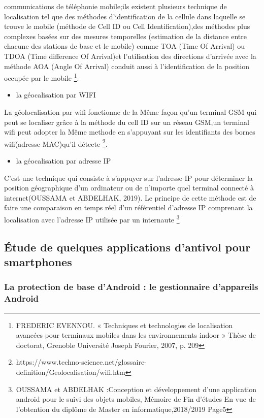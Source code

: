 \documentclass[a4paper, 12pt]{article}
\begin{document}
communications de téléphonie mobile;ils existent plusieurs technique de localisation tel que des méthodes d’identification de la cellule dans laquelle se trouve le mobile (méthode de Cell ID ou Cell Identification),des méthodes plus complexes basées sur des mesures temporelles (estimation de la distance entre chacune des stations de base et le mobile) comme TOA (Time Of Arrival) ou TDOA (Time difference Of Arrival)et l’utilisation des directions d’arrivée avec la méthode AOA (Angle Of Arrival) conduit aussi à l’identification de la position occupée par le mobile \footnote{FREDERIC EVENNOU. « Techniques et technologies de localisation avancées pour terminaux mobiles dans les environnements indoor » Thèse de doctorat, Grenoble Université Joseph Fourier, 2007, p. 209}.
\begin{itemize}
\item la géocalisation par WIFI
\end{itemize}
\quad La géolocalisation par wifi fonctionne de la Même façon qu'un terminal GSM qui peut se localiser grâce à la méthode du cell ID sur un réseau GSM,un terminal wifi peut adopter la Même methode en s'appuyant sur les identifiants des bornes wifi(adresse MAC)qu'il détecte \footnote{https://www.techno-science.net/glossaire-definition/Geolocalisation/wifi.htm}.
\begin{itemize}
\item la géocalisation par adresse IP
\end{itemize}
\quad C'est une technique qui consiste à s'appuyer sur l'adresse IP pour déterminer la position géographique d'un ordinateur ou de n'importe quel terminal connecté à internet(OUSSAMA et ABDELHAK, 2019). Le principe de cette méthode est de faire une comparaison en temps réel d'un référentiel d'adresse IP comprenant la localisation avec l'adresse IP utilisée par un internaute \footnote{OUSSAMA et ABDELHAK :Conception et développement d’une application android pour le suivi des objets mobiles, Mémoire de Fin d’études En vue de l’obtention du diplôme de Master en informatique,2018/2019 Page5}
\subsection{Étude de quelques applications d'antivol pour smartphones}
\subsubsection{La protection de base d’Android : le gestionnaire d’appareils Android}
\end{document}
